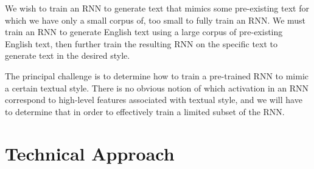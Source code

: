 \documentclass[10pt,twocolumn,letterpaper]{article}
\begin{document}
	We wish to train an RNN to generate text that  mimics some pre-existing text for which we have only a small corpus of, too small to fully train an RNN. We must train an RNN to generate English text using a large corpus of pre-existing English text, then further train the resulting RNN on the specific text to generate text in the desired style.
	
	The principal challenge is to determine how to train a pre-trained RNN to mimic a certain textual style. There is no obvious notion of which activation in an RNN correspond to high-level features associated with textual style, and we will have to determine that in order to effectively train a limited subset of the RNN.
\section{Technical Approach}
\end{document}
